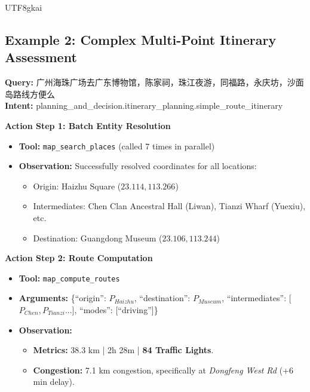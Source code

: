 \begin{CJK*}{UTF8}{gkai}



\subsection{Example 2: Complex Multi-Point Itinerary Assessment}
\begin{tcolorbox}[
    breakable,
    enhanced,
    colframe=color_amapblue,
    colback=mycolor,
    coltitle=white,
    title = {\textbf{Case Study: Multi-stop Route Feasibility Check}},
    fonttitle=\bfseries
]

\textbf{Query:} 广州海珠广场去广东博物馆，陈家祠，珠江夜游，同福路，永庆坊，沙面岛路线方便么\\
\textbf{Intent:} planning\_and\_decision.itinerary\_planning.simple\_route\_itinerary
\tcblower

\textbf{Action Step 1: Batch Entity Resolution}
\begin{itemize}[leftmargin=12pt, itemsep=0pt]
  \item \textbf{Tool:} \texttt{map\_search\_places} (called 7 times in parallel)
  \item \textbf{Observation:} Successfully resolved coordinates for all locations:
    \begin{itemize}[leftmargin=10pt, itemsep=0pt]
        \item Origin: Haizhu Square ($23.114, 113.266$)
        \item Intermediates: Chen Clan Ancestral Hall (Liwan), Tianzi Wharf (Yuexiu), etc.
        \item Destination: Guangdong Museum ($23.106,113.244$)
    \end{itemize}
\end{itemize}
\vspace{5pt}
\textbf{Action Step 2: Route Computation}
\begin{itemize}[leftmargin=12pt, itemsep=0pt]
  \item \textbf{Tool:} \texttt{map\_compute\_routes}
  \item \textbf{Arguments:} \{``origin'': $P_{Haizhu}$, ``destination'': $P_{Museum}$, ``intermediates'': [$P_{Chen}, P_{Tianzi}...$], ``modes'': [``driving'']\}
  \item \textbf{Observation:} 
    \begin{itemize}[leftmargin=10pt]
        \item \textbf{Metrics:} 38.3 km | 2h 28m | \textbf{84 Traffic Lights}.
        \item \textbf{Congestion:} 7.1 km congestion, specifically at \textit{Dongfeng West Rd} (+6 min delay).
    \end{itemize}
\end{itemize}


\end{tcolorbox}
\end{CJK*}
